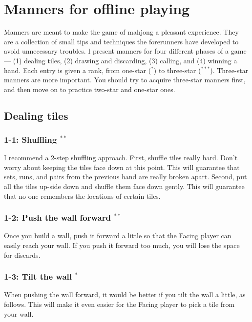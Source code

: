 
\chapter{Manners for offline playing} \label{ch:manners}

Manners are meant to make the game of mahjong a pleasant experience. 
They are a collection of small tips and techniques the forerunners have developed to avoid unnecessary troubles. 
I present manners for four different phases of a game --- (1) dealing tiles, (2) drawing and discarding, (3) calling, and (4) winning a hand. 
Each entry is given a rank, from one-star ($^*$) to three-star ($^{***}$). Three-star manners are more important. 
You should try to acquire three-star manners first, and then move on to practice two-star and one-star ones. 

\section{Dealing tiles}

\subsection*{1-1: Shuffling $^{**}$}
I recommend a 2-step shuffling approach. First, shuffle tiles really hard. Don't worry about keeping the tiles face down at this point. This will guarantee that sets, runs, and pairs from the previous hand are really broken apart. Second, put all the tiles up-side down and shuffle them face down gently. This will guarantee that no one remembers the locations of certain tiles. 

\subsection*{1-2: Push the wall forward $^{**}$}
Once you build a wall, push it forward a little so that the Facing player can easily reach your wall. If you push it forward too much, you will lose the space for discards. 


\subsection*{1-3: Tilt the wall $^{*}$}
When pushing the wall forward, it would be better if you tilt the wall a little, as follows. This will make it even easier for the Facing player to pick a tile from your wall.
\bp
{}
\ep

